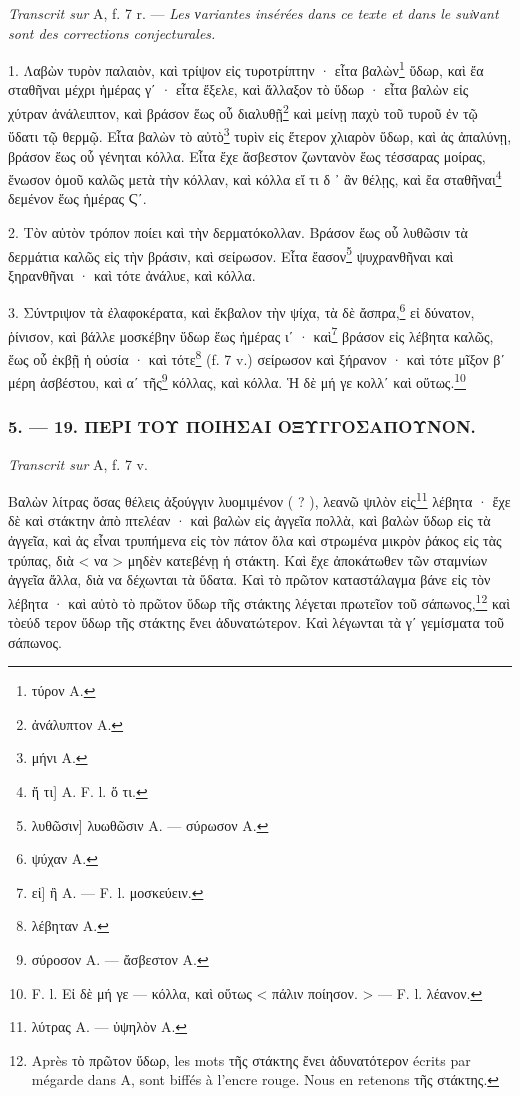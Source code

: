 \documentclass[a4paper, 11pt, oneside, polutonikogreek, french]{article}
\begin{document}
\emph{Transcrit sur} A, f. 7 r. --- \emph{Les νariantes insérées dans ce texte et dans le suiνant sont des corrections conjecturales.}

1. Λαβὼν τυρὸν παλαιὸν, καὶ τρίψον εἰς τυροτρίπτην · εἶτα βαλὼν\footnote{τύρον A.} ὕδωρ, καὶ ἔα σταθῆναι μέχρι ἡμέρας γʹ · εἶτα ἔξελε, καὶ ἄλλαξον τὸ ὕδωρ · εἶτα βαλὼν εἰς χύτραν ἀνάλειπτον, καὶ βράσον ἕως οὗ διαλυθῇ\footnote{ἀνάλυπτον A.} καὶ μείνῃ παχὺ τοῦ τυροῦ ἐν τῷ ὕδατι τῷ θερμῷ. Εἶτα βαλὼν τὸ αὐτὸ\footnote{μήνι A.} τυρὶν εἰς ἕτερον χλιαρὸν ὕδωρ, καὶ ἀς ἀπαλύνῃ, βράσον ἕως οὗ γένηται κόλλα. Εἶτα ἔχε ἄσβεστον ζωντανὸν ἕως τέσσαρας μοίρας, ἕνωσον ὁμοῦ καλῶς μετὰ τὴν κόλλαν, καὶ κόλλα εἴ τι δ ᾽ ἂν θέλῃς, καὶ ἔα σταθῆναι\footnote{ἤ τι] A. F. l. ὅ τι.} δεμένον ἕως ἡμέρας Ϛʹ.

2. Τὸν αὐτὸν τρόπον ποίει καὶ τὴν δερματόκολλαν. Βράσον ἕως οὗ λυθῶσιν τὰ δερμάτια καλῶς εἰς τὴν βράσιν, καὶ σείρωσον. Εἶτα ἔασον\footnote{λυθῶσιν] λυωθῶσιν A. --- σύρωσον A.} ψυχρανθῆναι καὶ ξηρανθῆναι · καὶ τότε ἀνάλυε, καὶ κόλλα.

3. Σύντριψον τὰ ἐλαφοκέρατα, καὶ ἔκβαλον τὴν ψίχα, τὰ δὲ ἄσπρα,\footnote{ψύχαν A.} εἰ δύνατον, ῥίνισον, καὶ βάλλε μοσκέβην ὕδωρ ἕως ἡμέρας ιʹ · καὶ\footnote{εἰ] ἢ A. --- F. l. μοσκεύειν.} βράσον εἰς λέβητα καλῶς, ἕως οὗ ἐκβῇ ἡ οὐσία · καὶ τότε\footnote{λέβηταν A.} (f. 7 v.) σείρωσον καὶ ξήρανον · καὶ τότε μῖξον βʹ μέρη ἀσβέστου, καὶ αʹ τῆς\footnote{σύροσον A. --- ἄσβεστον A.} κόλλας, καὶ κόλλα. Ἡ δὲ μή γε κολλʹ καὶ οὕτως.\footnote{F. l. Εἰ δὲ μή γε --- κόλλα, καὶ οὕτως < πάλιν ποίησον. > --- F. l. λέανον.}

\bigskip
\centerline{\EightStarTaper}
\centerline{\EightStarTaper\EightStarTaper}
\bigskip

\subsubsection{5. --- 19. ΠΕΡΙ ΤΟΥ ΠΟΙΗΣΑΙ ΟΞΥΓΓΟΣΑΠΟΥΝΟΝ.}

\emph{Transcrit sur} A, f. 7 v.

Βαλὼν λίτρας ὅσας θέλεις ἀξούγγιν λυομιμένον ( ? ), λεανῶ ψιλὸν εἰς\footnote{λύτρας A. --- ὑψηλὸν A.} λέβητα · ἔχε δὲ καὶ στάκτην ἀπὸ πτελέαν · καὶ βαλὼν εἰς ἀγγεῖα πολλὰ, καὶ βαλὼν ὕδωρ εἰς τὰ ἀγγεῖα, καὶ ἀς εἶναι τρυπήμενα εἰς τὸν πάτον ὅλα καὶ στρωμένα μικρὸν ῥάκος εἰς τὰς τρύπας, διὰ < να > μηδὲν κατεβένῃ ἡ στάκτη. Καὶ ἔχε ἀποκάτωθεν τῶν σταμνίων ἀγγεῖα ἄλλα, διὰ να δέχωνται τὰ ὕδατα. Καὶ τὸ πρῶτον καταστάλαγμα βάνε εἰς τὸν λέβητα · καὶ αὐτὸ τὸ πρῶτον ὕδωρ τῆς στάκτης λέγεται πρωτεῖον τοῦ σάπωνος,\footnote{Après τὸ πρῶτον ὕδωρ, les mots τῆς στάκτης ἔνει ἀδυνατότερον écrits par mégarde dans A, sont biffés à l'encre rouge. Nous en retenons τῆς στάκτης.} καὶ τὸεύδ τερον ὕδωρ τῆς στάκτης ἔνει ἀδυνατώτερον. Καὶ λέγωνται τὰ γʹ γεμίσματα τοῦ σάπωνος.
\end{document}
